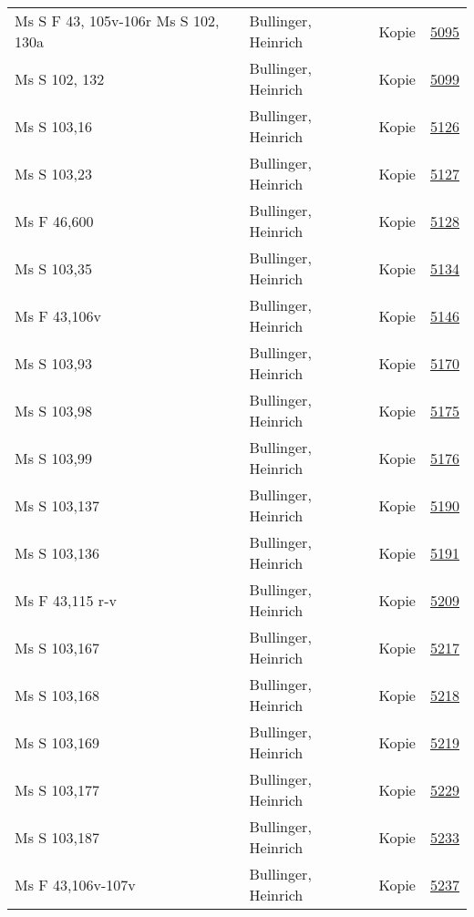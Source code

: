 \documentclass[10pt,a4paper,landscape]{report}
\begin{document}
\begin{longtable}{p{16cm}p{4cm}lr}
Ms S F 43, 105v-106r Ms S 102, 130a	&	Bullinger, Heinrich	&	Kopie	&	\href{http://130.60.24.72/assignment/5095}{5095}\\
Ms S 102, 132	&	Bullinger, Heinrich	&	Kopie	&	\href{http://130.60.24.72/assignment/5099}{5099}\\
Ms S 103,16	&	Bullinger, Heinrich	&	Kopie	&	\href{http://130.60.24.72/assignment/5126}{5126}\\
Ms S 103,23	&	Bullinger, Heinrich	&	Kopie	&	\href{http://130.60.24.72/assignment/5127}{5127}\\
Ms F 46,600	&	Bullinger, Heinrich	&	Kopie	&	\href{http://130.60.24.72/assignment/5128}{5128}\\
Ms S 103,35	&	Bullinger, Heinrich	&	Kopie	&	\href{http://130.60.24.72/assignment/5134}{5134}\\
Ms F 43,106v	&	Bullinger, Heinrich	&	Kopie	&	\href{http://130.60.24.72/assignment/5146}{5146}\\
Ms S 103,93	&	Bullinger, Heinrich	&	Kopie	&	\href{http://130.60.24.72/assignment/5170}{5170}\\
Ms S 103,98	&	Bullinger, Heinrich	&	Kopie	&	\href{http://130.60.24.72/assignment/5175}{5175}\\
Ms S 103,99	&	Bullinger, Heinrich	&	Kopie	&	\href{http://130.60.24.72/assignment/5176}{5176}\\
Ms S 103,137	&	Bullinger, Heinrich	&	Kopie	&	\href{http://130.60.24.72/assignment/5190}{5190}\\
Ms S 103,136	&	Bullinger, Heinrich	&	Kopie	&	\href{http://130.60.24.72/assignment/5191}{5191}\\
Ms F 43,115 r-v	&	Bullinger, Heinrich	&	Kopie	&	\href{http://130.60.24.72/assignment/5209}{5209}\\
Ms S 103,167	&	Bullinger, Heinrich	&	Kopie	&	\href{http://130.60.24.72/assignment/5217}{5217}\\
Ms S 103,168	&	Bullinger, Heinrich	&	Kopie	&	\href{http://130.60.24.72/assignment/5218}{5218}\\
Ms S 103,169	&	Bullinger, Heinrich	&	Kopie	&	\href{http://130.60.24.72/assignment/5219}{5219}\\
Ms S 103,177	&	Bullinger, Heinrich	&	Kopie	&	\href{http://130.60.24.72/assignment/5229}{5229}\\
Ms S 103,187	&	Bullinger, Heinrich	&	Kopie	&	\href{http://130.60.24.72/assignment/5233}{5233}\\
Ms F 43,106v-107v	&	Bullinger, Heinrich	&	Kopie	&	\href{http://130.60.24.72/assignment/5237}{5237}\\

\end{longtable}
\end{document}

